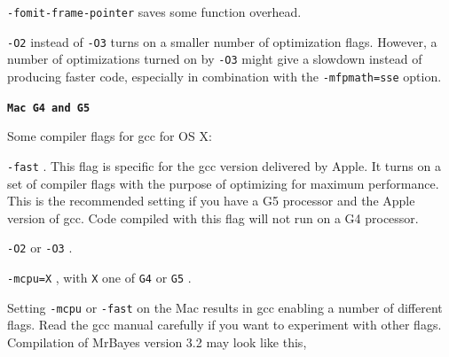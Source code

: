 \documentclass[12pt]{book}
\newcommand{\ttt}[1]{\texttt{#1} }
\newcommand{\tb}[1]{\texttt{\textbf{#1}} }
\begin{document}
\ttt{-fomit-frame-pointer} saves some function overhead. 

\ttt{-O2} instead of \ttt{-O3} turns on a smaller number of optimization flags. However, a number
of optimizations turned on by \ttt{-O3} might give a slowdown instead of producing faster code,
especially in combination with the \ttt{-mfpmath=sse} option. 

\tb{{Mac G4 and G5}}

Some compiler flags for gcc for OS X:

\ttt{-fast}. This flag is specific for the gcc version delivered by Apple.  It turns on a set of
compiler flags with the purpose of optimizing for maximum performance. This is the recommended
setting if you have a G5 processor and the Apple version of gcc. Code compiled with this flag will
not run on a G4 processor.

\ttt{-O2} or \ttt{-O3}.

\ttt{-mcpu=X}, with \ttt{X} one of \ttt{G4} or \ttt{G5}.

Setting \ttt{-mcpu} or \ttt{-fast} on the Mac results in gcc enabling a number of different flags.
Read the gcc manual carefully if you want to experiment with other flags.  Compilation of MrBayes
version 3.2 may look like this,
\end{document}
